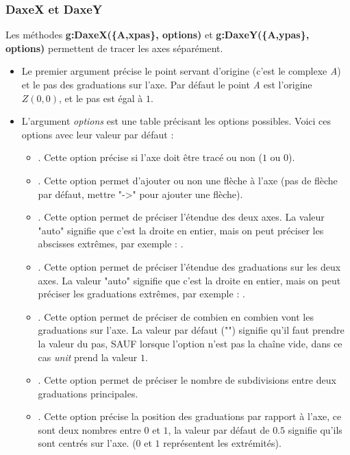\documentclass[%
10pt,%
a4paper,%
french,%
]%
{article}%
\begin{document}
\subsubsection{DaxeX et DaxeY}

Les méthodes \textbf{g:DaxeX(\{A,xpas\}, options)} et \textbf{g:DaxeY(\{A,ypas\}, options)} permettent de tracer les axes séparément.
\begin{itemize}
    \item Le premier argument précise le point servant d'origine (c'est le complexe \emph{A}) et le pas des graduations sur l'axe. Par défaut le point \emph{A} est l'origine $Z(0,0)$, et le pas est égal à $1$.
    \item L'argument \emph{options} est une table précisant les options possibles. Voici ces options avec leur valeur par défaut :
        \begin{itemize}
            \item {}. Cette option précise si l'axe doit être tracé ou non ($1$ ou $0$).
            \item {}. Cette option permet d'ajouter ou non une flèche à l'axe (pas de flèche par défaut, mettre "->" pour ajouter une flèche).
            \item {}. Cette option permet de préciser l'étendue des deux axes. La valeur "auto" signifie que c'est la droite en entier, mais on peut préciser les abscisses extrêmes, par exemple : .
            \item {}. Cette option permet de préciser l'étendue des graduations sur les deux axes. La valeur "auto" signifie que c'est la droite en entier, mais on peut préciser les graduations extrêmes, par exemple : .
            \item {}. Cette option permet de préciser de combien en combien vont les graduations sur l'axe. La valeur par défaut ("") signifie qu'il faut prendre la valeur du pas, SAUF lorsque l'option  n'est pas la chaîne vide, dans ce cas \emph{unit} prend la valeur $1$.
            \item {}. Cette option permet de préciser le nombre de subdivisions entre deux graduations principales.
            \item {}. Cette option précise la position des graduations par rapport à l'axe, ce sont deux nombres entre $0$ et $1$, la valeur par défaut de $0.5$ signifie qu'ils sont centrés sur l'axe. ($0$ et $1$ représentent les extrémités).

\end{itemize}
\end{itemize}
\end{document}
